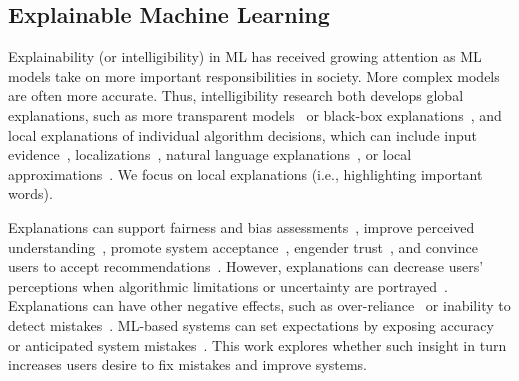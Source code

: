 \subsection{Explainable Machine Learning}
Explainability (or intelligibility) in ML has received growing
attention as ML models take on more important responsibilities in
society.
%
More complex models are often more accurate.
%
Thus, intelligibility research both develops global explanations, such as more transparent
models~\cite{Caruana2015IntelligibleReadmission,Alvarez-Melis2018TowardsNetworks,
Lage2018Human-in-the-loopPrior, Si2013LearningDetection} or black-box explanations~\cite{Lakkaraju2019FaithfulModels}, and local explanations of individual algorithm decisions, which can include
input evidence~\cite{Lei2016RationalizingPredictions,
Feng2019WhatPlay},
localizations~\cite{Selvaraju2017Grad-CAM:Localization,
Park2017AttentiveAbstract}, natural language
explanations~\cite{Camburu2018E-SNLI:Explanations,
Ehsan2019AutomatedPerceptions, Gkatzia2016NaturalInformation}, or
local approximations~\cite{Ribeiro2016WhyClassifier}.
%
We focus on local explanations (i.e., highlighting
important words).

Explanations can support
fairness and bias assessments~\cite{Dodge2019ExplainingJudgment}, improve perceived understanding~\cite{Kocielnik2019WillSystems},
promote system
acceptance~\cite{Herlocker2000ExplainingRecommendations}, engender
trust~\cite{Pu2006TrustInterfaces}, and convince users to accept
recommendations~\cite{Cramer2008TheRecommender}. However, explanations can decrease users' perceptions when algorithmic limitations or uncertainty
are portrayed~\cite{Cai2019TheInterface,
Stowers2017InsightsUncertainty, Lim2011InvestigatingApplications}.
%
Explanations can have other negative effects, such as over-reliance~\cite{Stumpf2016ExplanationsSystems} or inability to detect
mistakes~\cite{Poursabzi-Sangdeh2018ManipulatingInterpretability}.
%
ML-based systems can set expectations by exposing accuracy~\cite{Yin2019UnderstandingModels} or anticipated system mistakes~\cite{Kocielnik2019WillSystems}. This work explores whether such insight in turn increases users desire to fix mistakes and improve systems.
%

